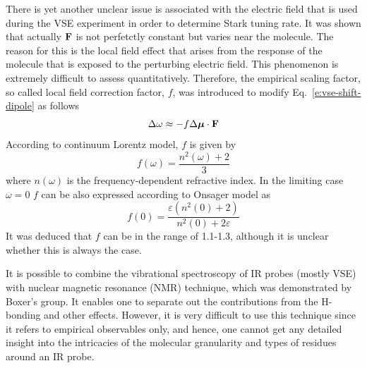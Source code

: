 \documentclass[a4paper,titlepage,twoside,fleqn,12pt]{book}
\newcommand{\BM}[1]{\ensuremath{\mbox{\boldmath${#1}$}}}
\begin{document}
\begin{refsection}
There is yet another unclear issue is associated with the electric field
that is used during the VSE experiment in order to determine Stark tuning rate.
It was shown that actually ${\bf F}$ is not perfetctly constant but varies
near the molecule. The reason for this is the local field effect that arises
from the response of the molecule that is exposed to the perturbing electric field.
This phenomenon is extremely difficult to assess quantitatively. Therefore, 
the empirical scaling factor, so called local field correction factor, $f$, 
was introduced to modify Eq.~\eqref{e:vse-shift-dipole} as follows
%
\begin{equation} \label{e:vse-shift-dipole-corr}
 \Delta \omega \approx - f \Delta {\BM \mu} \cdot {\bf F}
\end{equation}
%
According to continuum Lorentz model, $f$ is given by\citep{Wortmann.Bishop.JCP.1998}
%
\begin{equation}
f(\omega) = \frac{n^2(\omega)+2}{3}
\end{equation}
%
where $n(\omega)$ is the frequency-dependent refractive index.
In the limiting case $\omega=0$ $f$ can be also expressed according to Onsager
model as\citep{Wortmann.Bishop.JCP.1998}
%
\begin{equation}
f(0) = \frac{\varepsilon (n^2(0)+2)}{n^2(0)+2\varepsilon}
\end{equation}
%
It was deduced that $f$ can be in the range of 1.1-1.3\citep{Wortmann.Bishop.JCP.1998,
Bublitz.Boxer.AnnuRevPhysChem.1997}, although
it is unclear whether this is always the case.

It is possible to combine the vibrational spectroscopy of IR probes (mostly VSE) with nuclear magnetic 
resonance (NMR) technique, which was demonstrated by Boxer's 
group.\citep{Fafarman.Sigala.Herschlag.Boxer.JACS.2010,Bagchi.Fried.Boxer.JACS.2012} 
It enables one
to separate out the contributions from the H-bonding and other effects. However, 
it is very difficult to use this technique since it refers to empirical observables only,
and hence, one cannot get any detailed insight into the intricacies of the molecular granularity
and types of residues around an IR probe.


\end{refsection}
\end{document}
